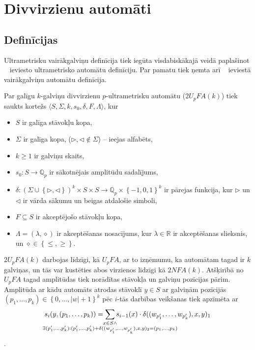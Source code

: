 \documentclass{ludis}
\begin{document}
\chapter{Divvirzienu automāti}
\section{Definīcijas}
Ultrametrisku vairākgalviņu definīcija tiek iegūta visdabiskākajā veidā paplašinot ~\citep{KasparsBalodis2013} ieviesto ultrametrisko automātu definīciju. Par pamatu tiek ņemta arī ~\citep{Holzer2009} ieviestā vairākgalviņu automātu definīcija.

\begin{definicija}
Par galīgu $k$-galviņu divvirzienu $p$-ultrametrisku automātu ($2U_pFA(k)$) tiek saukts kortežs $\langle S, \Sigma, k, s_0, \delta, F, \Lambda \rangle$, kur
\begin{itemize}
	\item $S$ ir galīga stāvokļu kopa,
	\item $\Sigma$ ir galīga kopa, ($ \triangleright,\triangleleft \notin \Sigma$) -- ieejas alfabēts,
	\item $k\geq 1$ ir galviņu skaits, 
	\item $s_0:S \rightarrow \mathbb{Q}_p$ ir sākotnējais amplitūdu sadalījums,
	\item $\delta: \left( \Sigma \cup \left\{ \triangleright, \triangleleft \right\} \right)^k \times S \times S \rightarrow \mathbb{Q}_p \times \left\{-1,0,1\right\}^k$ ir pārejas funkcija, kur $\triangleright$ un $\triangleleft$ ir vārda sākumu un beigas atdalošie simboli,
	\item $F \subseteq S$ ir akceptējošo stāvokļu kopa,
	\item $\Lambda = \left( \lambda, \diamond \right)$ ir akceptēšanas nosacījums, kur $\lambda \in \mathbb{R}$ ir akceptēšanas slieksnis, un $\diamond \in \left\{ \leq, \geq \right\}$.
\end{itemize}
\end{definicija}

$2U_pFA(k)$ darbojas līdzīgi, kā $U_pFA$, ar to izņēmumu, ka automātam tagad ir $k$ galviņas, un tās var kustēties abos virzienos līdzīgi kā $2NFA(k)$. Atšķirībā no $U_pFA$ tagad amplitūdas tiek norādītas stāvokļa un galviņu pozīcijas pārim. Amplitūda ar kādu automāts atrodas stāvoklī $y \in S$ ar galviņām pozīcijās
$\left( p_1, \ldots, p_k \right) \in \left\{ 0, \ldots, |w| +1 \right\}^k $
pēc $i$-tās darbības veikšanas tiek apzīmēta ar
\[
s_i (y, (p_1, \ldots, p_k)) =
\sum_{\mathclap{\substack{ x \in S \wedge \\
		\exists (p'_1, \ldots, p'_k):
		(p'_1, \ldots, p'_k) +
		\delta ((w_{p'_1}, \ldots, w_{p'_k}), x, y)_2 =
		(p_1, \ldots, p_k)}}}
	{s_{i-1}(x) \cdot \delta ((w_{p'_1}, \ldots, w_{p'_k}), x, y)_1 }
\].
\end{document}
